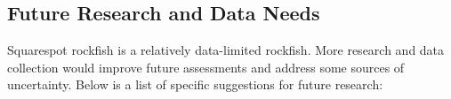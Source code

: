 \documentclass[11pt,
  english,
  a4paper,
]{article}
\begin{document}
\hypertarget{future-research-and-data-needs}{%
\subsection{Future Research and Data Needs}\label{future-research-and-data-needs}}

\leavevmode\tagmcend\tagstructend


Squarespot rockfish is a relatively data-limited rockfish. More research and data collection would improve future assessments and address some sources of uncertainty. Below is a list of specific suggestions for future research:

\leavevmode\tagmcend\tagstructend\par

\end{document}
